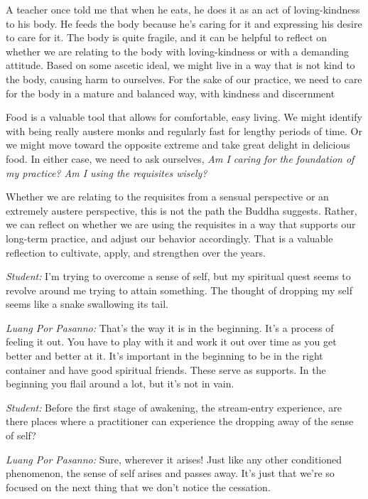 A teacher once told me that when he eats, he does it as an act of 
loving-kindness to his body. He feeds the body because he's caring for 
it and expressing his desire to care for it. The body is quite fragile, 
and it can be helpful to reflect on whether we are relating to the body 
with loving-kindness or with a demanding attitude. Based on some 
ascetic ideal, we might live in a way that is not kind to the body, 
causing harm to ourselves. For the sake of our practice, we need to 
care for the body in a mature and balanced way, with kindness and 
discernment

Food is a valuable tool that allows for comfortable, easy living. We 
might identify with being really austere monks and regularly fast for 
lengthy periods of time. Or we might move toward the opposite extreme 
and take great delight in delicious food. In either case, we need to 
ask ourselves, \emph{Am I caring for the foundation of my practice? Am 
I using the requisites wisely?}

Whether we are relating to the requisites from a sensual perspective or 
an extremely austere perspective, this is not the path the Buddha 
suggests. Rather, we can reflect on whether we are using the requisites 
in a way that supports our long-term practice, and adjust our behavior 
accordingly. That is a valuable reflection to cultivate, apply, and 
strengthen over the years.


\emph{Student:} I'm trying to overcome a sense of self, but my 
spiritual quest seems to revolve around me trying to attain something. 
The thought of dropping my self seems like a snake swallowing its tail.

\emph{Luang Por Pasanno:} That's the way it is in the beginning. It's a 
process of feeling it out. You have to play with it and work it out 
over time as you get better and better at it. It's important in the 
beginning to be in the right container and have good spiritual friends. 
These serve as supports. In the beginning you flail around a lot, but 
it's not in vain.

\emph{Student:} Before the first stage of awakening, the stream-entry 
experience, are there places where a practitioner can experience the 
dropping away of the sense of self?

\emph{Luang Por Pasanno:} Sure, wherever it arises! Just like any other 
conditioned phenomenon, the sense of self arises and passes away. It's 
just that we're so focused on the next thing that we don't notice the 
cessation.

